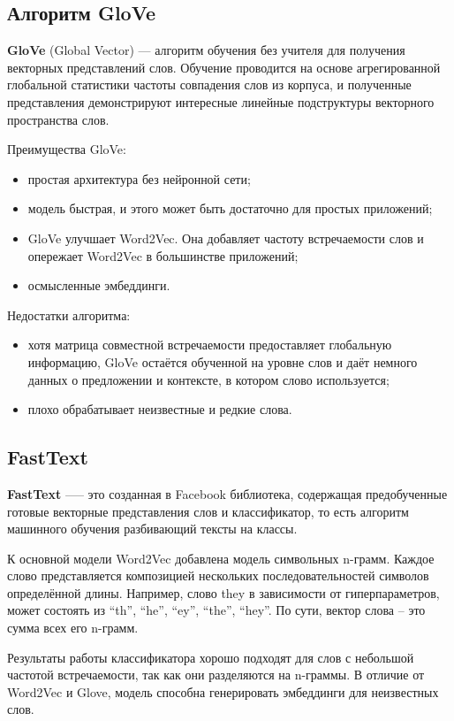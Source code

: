 \subsection{Алгоритм GloVe}
\textbf{GloVe} (Global Vector)\cite{phan1} --- алгоритм обучения без учителя  для получения векторных представлений слов. Обучение проводится на основе агрегированной глобальной статистики частоты совпадения слов из корпуса, и полученные представления демонстрируют интересные линейные подструктуры векторного пространства слов.  

Преимущества GloVe:
\begin{itemize}[label = ---]
    \item простая архитектура без нейронной сети;
    \item модель быстрая, и этого может быть достаточно для простых приложений;
    \item GloVe улучшает Word2Vec. Она добавляет частоту встречаемости слов и опережает Word2Vec в большинстве приложений;
    \item осмысленные эмбеддинги.
\end{itemize}

Недостатки алгоритма:
\begin{itemize}[label = ---]
    \item хотя матрица совместной встречаемости предоставляет глобальную информацию, GloVe остаётся обученной на уровне слов и даёт немного данных о предложении и контексте, в котором слово используется;
    \item плохо обрабатывает неизвестные и редкие слова.
\end{itemize}
\subsection{FastText}
\textbf{FastText}\cite{phan1} —-- это созданная в Facebook библиотека, содержащая предобученные готовые векторные представления слов и классификатор, то есть алгоритм машинного обучения разбивающий тексты на классы.

К основной модели Word2Vec добавлена модель символьных n-грамм. Каждое слово представляется композицией нескольких последовательностей символов определённой длины. Например, слово they в зависимости от гиперпараметров, может состоять из “th”, “he”, “ey”, “the”, “hey”. По сути, вектор слова – это сумма всех его n-грамм.

Результаты работы классификатора хорошо подходят для слов с небольшой частотой встречаемости, так как они разделяются на n-граммы. В отличие от Word2Vec и Glove, модель способна генерировать эмбеддинги для неизвестных слов.
